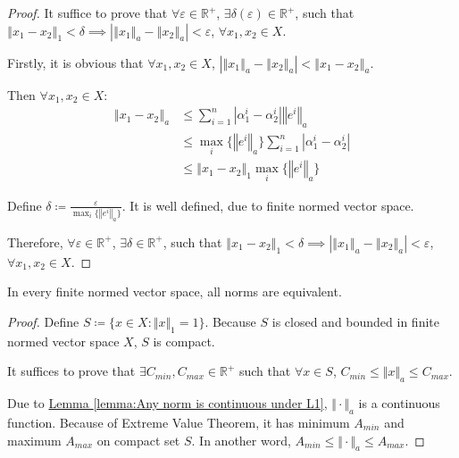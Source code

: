 \begin{proof}
It suffice to prove that $\forall \varepsilon \in \mathbb{R}^+$, $\exists \delta(\varepsilon) \in \mathbb{R}^+$, such that $\left\Vert x_1 - x_2 \right\Vert_{1} < \delta \implies \left\vert \left\Vert x_1 \right\Vert_{a} - \left\Vert x_2 \right\Vert_{a} \right\vert < \varepsilon$, $\forall x_1, x_2 \in X$. 

Firstly, it is obvious that $\forall x_1, x_2 \in X$, $\left\vert \left\Vert x_1 \right\Vert_{a} - \left\Vert x_2 \right\Vert_{a} \right\vert < \left\Vert x_1 - x_2 \right\Vert_{a}$. 

Then $\forall x_1, x_2 \in X$: 
\begin{align*}
\left\Vert x_1 - x_2 \right\Vert_{a}
&\leq \sum_{i=1}^{n} \left\vert \alpha_1^{i} - \alpha_2^{i} \right\vert \left\Vert e^{i} \right\Vert_{a} \\
&\leq \max_i \{\left\Vert e^{i} \right\Vert_{a} \} \sum_{i=1}^{n} \left\vert \alpha_1^{i} - \alpha_2^{i} \right\vert \\
&\leq \left\Vert x_1 - x_2 \right\Vert_{1} \max_i \{ \left\Vert e^{i} \right\Vert_{a} \}
\end{align*}

Define $\delta \coloneqq \frac{\varepsilon}{\max_i \{ \left\Vert e^{i} \right\Vert_{a} \} }$. It is well defined, due to finite normed vector space. 

Therefore, $\forall \varepsilon \in \mathbb{R}^+$, $\exists \delta \in \mathbb{R}^+$, such that $\left\Vert x_1 - x_2 \right\Vert_{1} < \delta \implies \left\vert \left\Vert x_1 \right\Vert_{a} - \left\Vert x_2 \right\Vert_{a} \right\vert < \varepsilon$, $\forall x_1, x_2 \in X$. 
\end{proof}

\begin{theorem}
In every finite normed vector space, all norms are equivalent. 
\end{theorem}

\begin{proof}
Define $S \coloneqq \{x \in X \colon \Vert x \Vert_1 = 1\}$. Because $S$ is closed and bounded in finite normed vector space $X$, $S$ is compact. 

It suffices to prove that $\exists C_{min}, C_{max} \in \mathbb{R}^+$ such that $\forall x \in S$, $C_{min} \leq \Vert x \Vert_{a} \leq C_{max}$. 

Due to \hyperref[lemma:Any norm is continuous under L1]{Lemma \ref*{lemma:Any norm is continuous under L1}}, $\Vert \cdot \Vert_a$ is a continuous function. Because of Extreme Value Theorem, it has minimum $A_{min}$ and maximum $A_{max}$ on compact set $S$. In another word, $A_{min} \leq \Vert \cdot \Vert_{a} \leq A_{max}$.
\end{proof}

